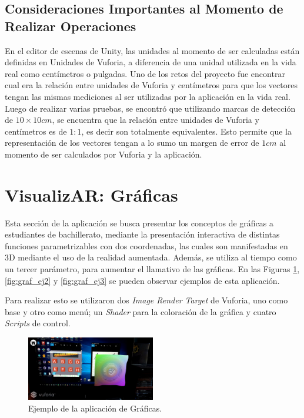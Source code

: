 \subsection{Consideraciones Importantes al Momento de Realizar Operaciones} 
En el editor de escenas de Unity, las unidades al momento de ser calculadas están definidas en Unidades de Vuforia, a diferencia de una unidad utilizada en la vida real como centímetros o pulgadas. Uno de los retos del proyecto fue encontrar cual era la relación entre unidades de Vuforia y centímetros para que los vectores tengan las mismas mediciones al ser utilizadas por la aplicación en la vida real. Luego de realizar varias pruebas, se encontró que utilizando marcas de detección de $10\times 10cm$, se encuentra que la relación entre unidades de Vuforia y centímetros es de $1:1$, es decir son totalmente equivalentes. Esto permite que la representación de los vectores tengan a lo sumo un margen de error de $1 cm$ al momento de ser calculados por Vuforia y la aplicación.


\section{VisualizAR: Gráficas}
Esta sección de la aplicación se busca presentar los conceptos de gráficas a estudiantes de bachillerato, mediante la presentación interactiva de distintas funciones parametrizables con dos coordenadas, las cuales son manifestadas en 3D mediante el uso de la realidad aumentada. Además, se utiliza al tiempo como un tercer parámetro, para aumentar el llamativo de las gráficas. En las Figuras \ref{fig:graf_ej1}, \ref{fig:graf_ej2} y \ref{fig:graf_ej3} se pueden observar ejemplos de esta aplicación.

Para realizar esto se utilizaron dos \textit{Image Render Target} de Vuforia, uno como base y otro como menú; un \textit{Shader} para la coloración de la gráfica y cuatro \textit{Scripts} de control.

\begin{figure}[hbt!]
\centering
\includegraphics[width=0.5\textwidth]{figuras/graficas/ej1.png}
\caption{\label{fig:graf_ej1}Ejemplo de la aplicación de Gráficas.}
\end{figure}

